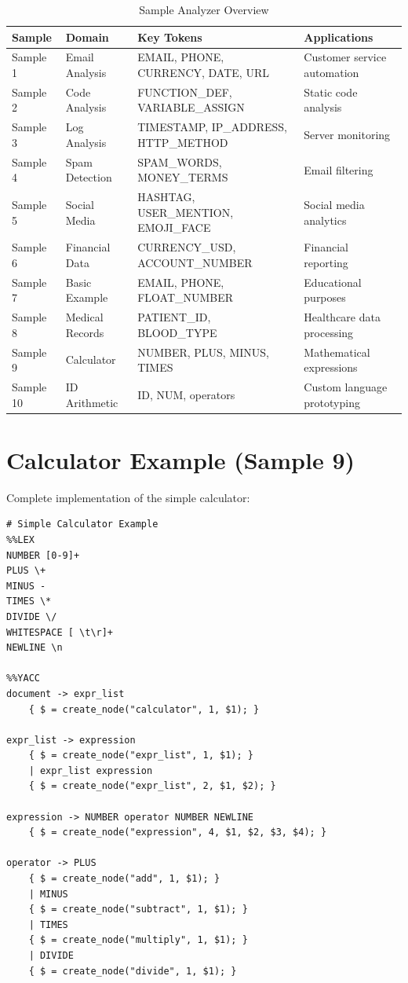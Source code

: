 \documentclass[a4paper,12pt]{report}
\begin{document}
\begin{table}[H]
\centering
\small
\begin{tabular}{|p{1.5cm}|p{3cm}|p{4cm}|p{4cm}|}
\hline
\textbf{Sample} & \textbf{Domain} & \textbf{Key Tokens} & \textbf{Applications} \\
\hline
Sample 1 & Email Analysis & EMAIL, PHONE, CURRENCY, DATE, URL & Customer service automation \\
\hline
Sample 2 & Code Analysis & FUNCTION\_DEF, VARIABLE\_ASSIGN & Static code analysis \\
\hline
Sample 3 & Log Analysis & TIMESTAMP, IP\_ADDRESS, HTTP\_METHOD & Server monitoring \\
\hline
Sample 4 & Spam Detection & SPAM\_WORDS, MONEY\_TERMS & Email filtering \\
\hline
Sample 5 & Social Media & HASHTAG, USER\_MENTION, EMOJI\_FACE & Social media analytics \\
\hline
Sample 6 & Financial Data & CURRENCY\_USD, ACCOUNT\_NUMBER & Financial reporting \\
\hline
Sample 7 & Basic Example & EMAIL, PHONE, FLOAT\_NUMBER & Educational purposes \\
\hline
Sample 8 & Medical Records & PATIENT\_ID, BLOOD\_TYPE & Healthcare data processing \\
\hline
Sample 9 & Calculator & NUMBER, PLUS, MINUS, TIMES & Mathematical expressions \\
\hline
Sample 10 & ID Arithmetic & ID, NUM, operators & Custom language prototyping \\
\hline
\end{tabular}
\caption{Sample Analyzer Overview}
\label{tab:samples}
\end{table}

\section{Calculator Example (Sample 9)}
Complete implementation of the simple calculator:

\begin{lstlisting}[caption=Calculator .def File, label=lst:calculator_def]
# Simple Calculator Example
%%LEX
NUMBER [0-9]+
PLUS \+
MINUS -
TIMES \*
DIVIDE \/
WHITESPACE [ \t\r]+
NEWLINE \n

%%YACC
document -> expr_list
    { $ = create_node("calculator", 1, $1); }

expr_list -> expression
    { $ = create_node("expr_list", 1, $1); }
    | expr_list expression
    { $ = create_node("expr_list", 2, $1, $2); }

expression -> NUMBER operator NUMBER NEWLINE
    { $ = create_node("expression", 4, $1, $2, $3, $4); }

operator -> PLUS
    { $ = create_node("add", 1, $1); }
    | MINUS
    { $ = create_node("subtract", 1, $1); }
    | TIMES
    { $ = create_node("multiply", 1, $1); }
    | DIVIDE
    { $ = create_node("divide", 1, $1); }
\end{lstlisting}
\end{document}
